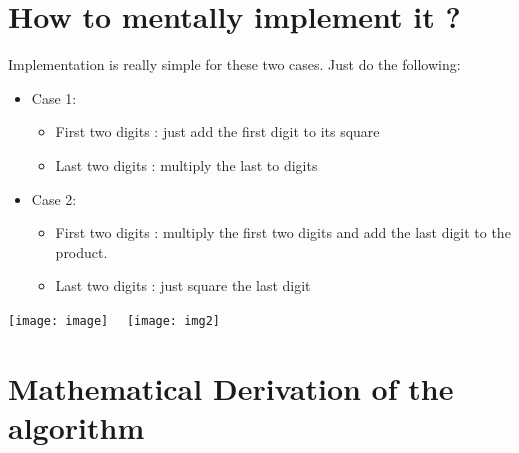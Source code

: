 \documentclass{article}
\begin{document}
\section{How to mentally implement it ? }
    Implementation is really simple for these two cases. Just do the following:
    \begin{itemize}
        \item Case 1:
            \begin{itemize}
                \item First two digits : just add the first digit to its square
                \item Last two digits  : multiply the last to digits
            \end{itemize}
        \item Case 2:
            \begin{itemize}
                \item First two digits : multiply the first two digits and add the last digit to the product.
                \item Last two digits  : just square the last digit
            \end{itemize}
        
    \end{itemize}
    \floatsep 1cm
    \texttt{[image: image]} \ \ 
    \texttt{[image: img2]}
\section{Mathematical Derivation of the algorithm}
   
\end{document}
